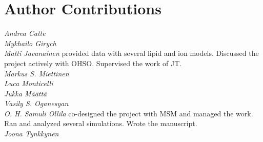 \documentclass[pre,aps,floatfix,authordate1-4,twocolumn]{revtex4-1}
\begin{document}
\section{Author Contributions}
\noindent 
{\it Andrea Catte} \\
{\it Mykhailo Girych} \\
{\it Matti Javanainen} provided data with several lipid and ion models. Discussed the project actively with OHSO. Supervised the work of JT.\\
{\it Markus S. Miettinen} \\
{\it Luca Monticelli}  \\
{\it Jukka M{\"a}{\"a}tt{\"a}}  \\
{\it Vasily S. Oganesyan} \\
{\it O. H. Samuli Ollila} co-designed the project with MSM and managed the work. Ran and analyzed several simulations. Wrote the manuscript. \\
{\it Joona Tynkkynen } \\

\listoftodos



\end{document}
